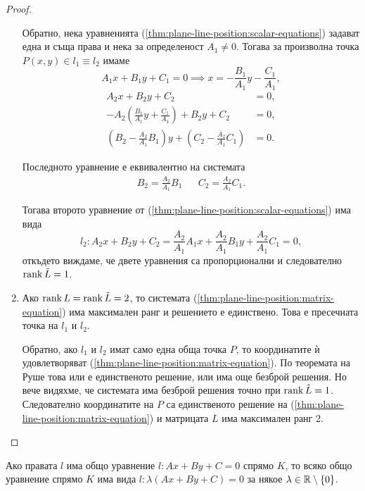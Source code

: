 \documentclass[numbers=endperiod, DIV=15, bibliography=totocnumbered]{scrartcl}
\begin{document}
\begin{proof}
\begin{enumerate}
    Обратно, нека уравненията (\ref{thm:plane-line-position:scalar-equations}) задават една и съща права и нека за определеност $A_1 \neq 0$. Тогава за произволна точка $P(x, y) \in l_1 \equiv l_2$ имаме
    \begin{displaymath}
      A_1x + B_1y + C_1 = 0
      \implies
      x = - \frac {B_1} {A_1} y - \frac {C_1} {A_1},
    \end{displaymath}
    \begin{align*}
      A_2x + B_2y + C_2 &= 0,
      \\
      - A_2 \left(\frac {B_1} {A_1} y + \frac {C_1} {A_1} \right) + B_2y + C_2 &= 0,
      \\
      \left(B_2 - \frac {A_2} {A_1} B_1 \right) y + \left(C_2 - \frac {A_2} {A_1} C_1 \right) &= 0.
    \end{align*}

    Последното уравнение е еквивалентно на системата
    \begin{align*}
      B_2 = \frac {A_2} {A_1} B_1
      &&
      C_2 = \frac {A_2} {A_1} C_1.
    \end{align*}

    Тогава второто уравнение от (\ref{thm:plane-line-position:scalar-equations}) има вида
    \begin{displaymath}
      l_2:
      A_2 x + B_2 y + C_2 =
      \frac {A_2} {A_1} A_1 x + \frac {A_2} {A_1} B_1 y + \frac {A_2} {A_1} C_1
      = 0,
    \end{displaymath}
    откъдето виждаме, че двете уравнения са пропорционални и следователно $\operatorname{rank} \tilde L = 1$.

    \item Ако $\operatorname{rank} L = \operatorname{rank} \tilde L = 2$, то системата (\ref{thm:plane-line-position:matrix-equation}) има максимален ранг и решението е единствено. Това е пресечната точка на $l_1$ и $l_2$.

    Обратно, ако $l_1$ и $l_2$ имат само една обща точка $P$, то координатите ѝ удовлетворяват (\ref{thm:plane-line-position:matrix-equation}). По теоремата на Руше това или е единственото решение, или има още безброй решения. Но вече видяхме, че системата има безброй решения точно при $\operatorname{rank} \tilde L = 1$. Следователно координатите на $P$ са единственото решение на (\ref{thm:plane-line-position:matrix-equation}) и матрицата $L$ има максимален ранг 2.
  \end{enumerate}
\end{proof}

\begin{corollary}
  Ако правата $l$ има общо уравнение $l: Ax + By + C = 0$ спрямо $K$, то всяко общо уравнение спрямо $K$ има вида $l: \lambda(Ax + By + C) = 0$ за някое $\lambda \in \mathbb{R} \setminus \{ 0 \}$.
\end{corollary}
\end{document}
